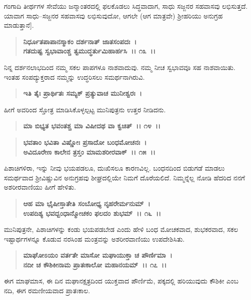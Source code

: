 ಗಂಗಾದಿ ತೀರ್ಥಗಳ ಸೇವೆಯು ಜನ್ಮಾಂತರದಲ್ಲಿ ಫಲಕೊಡಲು ಸಿದ್ಧವಾದಾಗ, ಸಾಧು ಸಜ್ಜನರ ಸಹವಾಸವು ಲಭಿಸುತ್ತದೆ. ಯಾವಾಗ ಸಾಧು–ಸಜ್ಜನರ ಸಹವಾಸವು ಲಭಿಸುವುದೋ, ಆಗಲೇ (ಆಗ ಮಾತ್ರವೇ) ಶ‍್ರೀಹರಿಯು ಅನುಗ್ರಹ ಮಾಡುತ್ತಾನೆ].

\begin{verse}
\textbf{ನಿರ್ಧೂತಪಾಪಾನಸ್ಮಾಕಂ ದರ್ಶನಾತ್ ಜಾತಸಂಪದಃ~।}\\\textbf{ಗತದುಷ್ಟ ಸ್ವಭಾವಾಂಶ್ಚ ತ್ವಮುದ್ಧರ್ತುಮಿಹಾರ್ಹಸಿ~।। ೧೩~।।}
\end{verse}

ನಿನ್ನ ದರ್ಶನಲಾಭದಿಂದ ನಮ್ಮ ಸಕಲ ಪಾಪಗಳೂ ನಾಶವಾದುವು. ನಮ್ಮ ನೀಚ ಸ್ವಭಾವವೂ ಸಹ ನಾಶವಾಯಿತು. ಇಂತಹ ಸಂಪದ್ಯುಕ್ತರಾದ ನಮ್ಮನ್ನು ಉದ್ಧರಿಸಲು ಸಮರ್ಥನಾಗಿರುವಿ.

\begin{verse}
\textbf{ಇತಿ ತೈಃ ಪ್ರಾರ್ಥಿತಃ ಸಮ್ಯಕ್ ಪ್ರತ್ಯುವಾಚ ಮುನೀಶ್ವರಃ~।}
\end{verse}

ಹೀಗೆ ಅವರಿಂದ ಸ್ತೋತ್ರ ಮಾಡಿಸಿಕೊಳ್ಳಲ್ಪಟ್ಟ ಮುನಿಪುತ್ರನು ಉತ್ತರ ನೀಡಿದನು.

\begin{verse}
\textbf{ಮಾ ಬಿಭ್ಯತ ಭವಂತಶ್ಚ ಮಾ ವಿಷೀದಥ ವಾ ಕ್ವಚಿತ್~।। ೧೪~।।} 
\end{verse}

\begin{verse}
\textbf{ಭವತಾಂ ಭವಿತಾ ವಿಷ್ಣೋಃ ಪ್ರಸಾದೋ ಬಂಧಮೋಚನಃ~।}\\\textbf{ಅವಿದೂರೇಣ ಕಾಲೇನ ತ್ರಸ್ತಂ ಮಾಮಶರೀರವಾಕ್~।। ೧೫~।।}
\end{verse}

ಪಿಶಾಚಿಗಳಿರಾ, ಇನ್ನು ನೀವು ಭಯಪಡಲೂ, ದುಃಖಿಸಲೂ ಕಾರಣವಿಲ್ಲ. ಬಂಧನದಿಂದ ಬಿಡುಗಡೆ ಮಾಡಲು ಸಮರ್ಥವಾದ ಶ‍್ರೀವಿಷ್ಣುವಿನ ಅನುಗ್ರಹವು ಶೀಘ್ರದಲ್ಲಿಯೇ ನಿಮಗೆ ದೊರೆಯಲಿದೆ. ನಿಮ್ಮನ್ನೆಲ್ಲ ನೋಡಿ ಹೆದರಿದ ನನಗೆ ಅಶರೀರವಾಣಿಯು ಹೀಗೆ ಹೇಳಿತು.

\begin{verse}
\textbf{ಆಹ ಮಾ ಭೈಷೀಸ್ತಾತೇತಿ ಸಂಬೋಧ್ಯ ನೃಹರೇರ್ಮನುಮ್~।}\\\textbf{ಉಪದಿಶ್ಯ ಭವದ್ಬಂಧಾನ್ಮೋಚಕಂ ಫಲದಂ ಶುಭಮ್~।। ೧೬~।।}
\end{verse}

ಮುನಿಪುತ್ರನೇ, ಪಿಶಾಚಿಗಳನ್ನು ಕಂಡು ಭಯಪಡಬೇಡ ಎಂದು ಹೇಳಿ ಬಂಧ ಮೋಚಕವಾದ, ಶುಭಕರವಾದ, ಸಕಲ ಇಷ್ಟಾರ್ಥಗಳನ್ನೂ ಕೊಡುವ ನರಸಿಂಹ ಮಂತ್ರವನ್ನು ಅಶರೀರ\-ವಾಣಿಯು ಉಪದೇಶಿಸಿತು.

\begin{verse}
\textbf{ಮಾಘೋಽಯಂ ವರ್ತತೇ ಮಾಸೋ ಮಘಾಯುಕ್ತಾ ಚ ಪೌರ್ಣಿಮಾ~।}\\\textbf{ನದೀ ಚ ಕೌಶಿಕೀನಾಮ ಪ್ರಾತಃಕಾಲೋ ಮಹಾನಯಮ್~।। ೧೭~।।}
\end{verse}

ಈಗ ಮಾಘಮಾಸ, ಈ ದಿನ ಮಘಾನಕ್ಷತ್ರದಿಂದ ಯುಕ್ತವಾದ ಪೌರ್ಣಿಮೆ, ಪಕ್ಕದಲ್ಲಿ ಹರಿಯುವುದು ಕೌಶಿಕೀ ಎಂಬ ನದಿ, ಈಗ ರಮಣೀಯವಾದ ಪ್ರಾತಃಕಾಲ.

